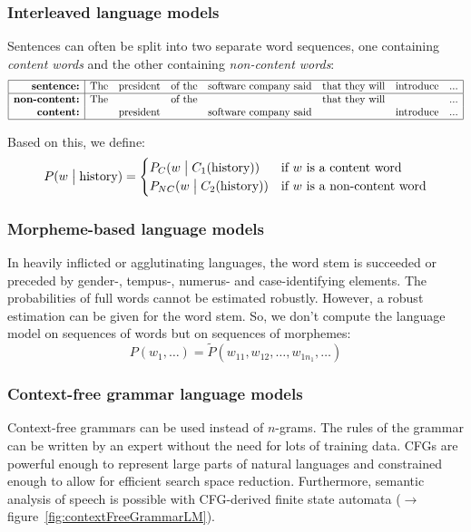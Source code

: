 \documentclass[11pt]{article}
\begin{document}
\subsubsection{Interleaved language models}
Sentences can often be split into two separate word sequences, one containing \textit{content words} and the other containing \textit{non-content words}:
\[
\begin{array}{|r|ccccccc|}
    \hline
    \mbox{\textbf{sentence:}} & \mbox{The} & \mbox{president} & \mbox{of the} & \mbox{software company said} & \mbox{that they will} & \mbox{introduce} & \mbox{...} \\
    \hline
    \mbox{\textbf{non-content:}} & \mbox{The} & & \mbox{of the} & & \mbox{that they will} & & \mbox{...} \\
    \mbox{\textbf{content:}} & & \mbox{president} & & \mbox{software company said} & & \mbox{introduce} & \mbox{...} \\
    \hline
\end{array}
\]

Based on this, we define:
\[
    P(w \bigm| \mbox{history}) = \begin{cases}
        P_C(w \bigm| C_1(\mbox{history})) & \mbox{if $w$ is a content word} \\
        P_{NC}(w \bigm| C_2(\mbox{history})) & \mbox{if $w$ is a non-content word}
    \end{cases}
\]

\subsubsection{Morpheme-based language models}
In heavily inflicted or agglutinating languages, the word stem is succeeded or preceded by gender-, tempus-, numerus- and case-identifying elements. The probabilities of full words cannot be estimated robustly. However, a robust estimation can be given for the word stem. So, we don't compute the language model on sequences of words but on sequences of morphemes:
\[
    P(w_1, \ldots) = \tilde{P}(w_{11}, w_{12}, \ldots, w_{1n_1}, \ldots)
\]

\subsubsection{Context-free grammar language models}
Context-free grammars can be used instead of $n$-grams. The rules of the grammar can be written by an expert without the need for lots of training data. CFGs are powerful enough to represent large parts of natural languages and constrained enough to allow for efficient search space reduction. Furthermore, semantic analysis of speech is possible with CFG-derived finite state automata ($\to$ figure~\ref{fig:contextFreeGrammarLM}).
\end{document}
